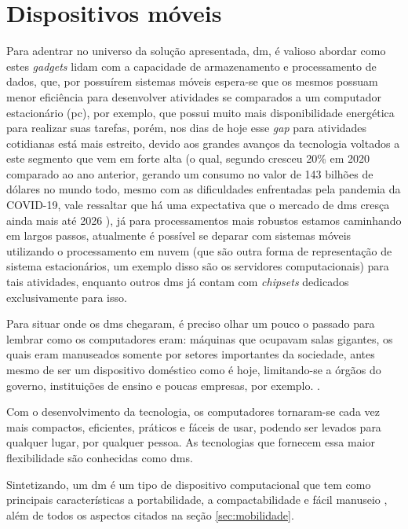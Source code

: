 \section{Dispositivos móveis}\label{sec:dm}
Para adentrar no universo da solução apresentada, \ac{dm}, é valioso abordar como estes \textit{gadgets} lidam com a capacidade de armazenamento e processamento de dados, que, por possuírem sistemas móveis espera-se que os mesmos possuam menor eficiência para desenvolver atividades se comparados a um computador estacionário (\ac{pc}), por exemplo, que possui muito mais disponibilidade energética para realizar suas tarefas, porém, nos dias de hoje esse \textit{gap} para atividades cotidianas está mais estreito, devido aos grandes avanços da tecnologia voltados a este segmento que vem em forte alta (o qual, segundo \citet{data.ai} cresceu 20\% em 2020 comparado ao ano anterior, gerando um consumo no valor de 143 bilhões de dólares no mundo todo, mesmo com as dificuldades enfrentadas pela pandemia da COVID-19, vale ressaltar que há uma expectativa que o mercado de \acp{dm} cresça ainda mais até 2026 \cite{mordor_intelligence_2021}), já para processamentos mais robustos estamos caminhando em largos passos, atualmente é possível se deparar com sistemas móveis utilizando o processamento em nuvem (que são outra forma de representação de sistema estacionários, um exemplo disso são os servidores computacionais) para tais atividades, enquanto outros \acp{dm} já contam com \textit{chipsets} dedicados exclusivamente para isso.

Para situar onde os \acp{dm} chegaram, é preciso olhar um pouco o passado para lembrar como os computadores eram: máquinas que ocupavam salas gigantes, os quais eram manuseados somente por setores importantes da sociedade, antes mesmo de ser um dispositivo doméstico como é hoje, limitando-se a órgãos do governo, instituições de ensino e poucas empresas, por exemplo. \citet{alecrim_2013}.

Com o desenvolvimento da tecnologia, os computadores tornaram-se cada vez mais compactos, eficientes, práticos e fáceis de usar, podendo ser levados para qualquer lugar, por qualquer pessoa. As tecnologias que fornecem essa maior flexibilidade são conhecidas como \acp{dm}.

Sintetizando, um \ac{dm} é um tipo de dispositivo computacional que tem como principais características a portabilidade, a compactabilidade e fácil manuseio \citet{lee2005aplicaccoes}, além de todos os aspectos citados na seção \ref{sec:mobilidade}. 

